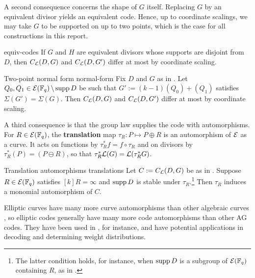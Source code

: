 \documentclass[twocolumn, 11pt]{scrartcl}
\begin{document}
A second consequence concerns the shape of $G$ itself. Replacing $G$ by an equivalent divisor yields an equivalent code. Hence, up to coordinate scalings, we may take $G$ to be supported on up to two points, which is the case for all constructions in this report.

\begin{lemma}{\cite[Prop.~2.2.14]{stichtenoth2009algebraic}}{equiv-codes}
    If $G$ and $H$ are equivalent divisors whose supports are disjoint from $D$, then $C_\mathcal{L}(D,G)$ and $C_\mathcal{L}(D,G')$ differ at most by coordinate scaling.
\end{lemma}

\begin{corollary}{Two-point normal form \cite{wang2025nonrs,zhu2026isodual}}{normal-form}
    Fix $D$ and $G$ as in . Let $Q_0,Q_1\in\mathcal{E}(\mathbb{F}_q)\operatorname{\setminus}\operatorname{supp} D$ be such that $G':=(k-1)(Q_0)+(Q_1)$ satisfies $\Sigma(G')=\Sigma(G)$. Then $C_\mathcal{L}(D,G)$ and $C_\mathcal{L}(D,G')$ differ at most by coordinate scaling.
\end{corollary}

A third consequence is that the group law supplies the code with automorphisms. For $R\in\mathcal{E}(\mathbb{F}_q)$, the \textbf{translation} map $\tau_R:P\mapsto P\oplus R$ is an automorphism of $\mathcal{E}$ as a curve. It acts on functions by $\tau_R^*f=f\circ\tau_R$ and on divisors by $\tau_R^*(P)=(P\ominus R)$, so that $\tau_R^*\mathcal{L}(G)=\mathcal{L}(\tau_R^*G)$.

\begin{theorem}{Translation automorphisms \cite{ma2023automorphism}}{translations}
    Let $C:=C_\mathcal{L}(D,G)$ be as in . Suppose $R\in\mathcal{E}(\mathbb{F}_q)$ satisfies $[k]R=\infty$ and $\operatorname{supp} D$ is stable under $\tau_R$.\footnote{The latter condition holds, for instance, when $\operatorname{supp} D$ is a subgroup of $\mathcal{E}(\mathbb{F}_q)$ containing $R$, as in .} Then $\tau_R$ induces a monomial automorphism of $C$.
\end{theorem}

Elliptic curves have many more curve automorphisms than other algebraic curves \cite{ma2023automorphism,stichtenoth1973automorphism}, so elliptic codes generally have many more code automorphisms than other AG codes. They have been used in \cite{tong2013quasicyclic,ma2023automorphism}, for instance, and have potential applications in decoding and determining weight distributions.
\end{document}
